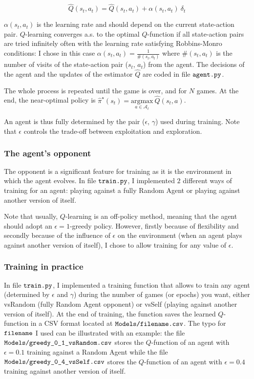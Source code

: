 \documentclass{article}
\begin{document}
\begin{equation}
    \hat{Q}(s_t, a_t) = \hat{Q}(s_t, a_t) + \alpha(s_t, a_t) \ \delta_t
\end{equation}{}

$\alpha(s_t, a_t)$ is the learning rate and should depend on the current state-action pair. $Q$-learning converges a.s. to the optimal $Q$-function if all state-action pairs are tried infinitely often with the learning rate satisfying Robbins-Monro conditions: I chose in this case $\alpha(s_t, a_t) = \frac{1}{\#(s_t, a_t)}$ where $\#(s_t, a_t)$ is the number of visits of the state-action pair ($s_t$, $a_t$) from the agent. The decisions of the agent and the updates of the estimator $\hat{Q}$ are coded in file $\verb|agent.py|$.

The whole process is repeated until the game is over, and for $N$ games. At the end, the near-optimal policy is $\hat{\pi}^\star(s_t) = \underset{a \in \mathcal{A}_t}{\text{argmax}} \ \hat{Q}(s_t, a)$.

An agent is thus fully determined by the pair ($\epsilon$, $\gamma$) used during training. Note that $\epsilon$ controls the trade-off between exploitation and exploration. 

\subsubsection*{The agent's opponent}

The opponent is a significant feature for training as it is the environment in which the agent evolves. In file $\verb|train.py|$, I implemented $2$ different ways of training for an agent: playing against a fully Random Agent or playing against another version of itself. 

Note that usually, $Q$-learning is an off-policy method, meaning that the agent should adopt an $\epsilon = 1$-greedy policy. However, firstly because of flexibility and secondly because of the influence of $\epsilon$ on the environment (when an agent plays against another version of itself), I chose to allow training for any value of $\epsilon$.

\subsubsection*{Training in practice}

In file $\verb|train.py|$, I implemented a training function that allows to train any agent (determined by $\epsilon$ and $\gamma$) during the number of games (or epochs) you want, either vsRandom (fully Random Agent opponent) or vsSelf (playing against another version of itself). At the end of training, the function saves the learned $Q$-function in a CSV format located at $\verb|Models/filename.csv|$. The typo for $\verb|filename|$ I used can be illustrated with an example: the file $\verb|Models/greedy_0_1_vsRandom.csv|$ stores the $Q$-function of an agent with $\epsilon = 0.1$ training against a Random Agent while the file $\verb|Models/greedy_0_4_vsSelf.csv|$ stores the $Q$-function of an agent with $\epsilon = 0.4$ training against another version of itself. 
\end{document}
